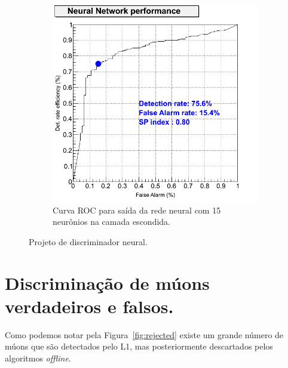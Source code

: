 \begin{figure}[htpb!]
\begin{subfigure}[b]{0.45\textwidth}
                \includegraphics[width=\textwidth]{images/sglmuon/roc_perf_match_NN.png}
            \caption{Curva ROC para saída da rede neural com 15 neurônios na
            camada escondida.}
            \label{fig:ROCNN191715}
        \end{subfigure}
        \caption{Projeto de discriminador neural.}
\end{figure}

\section{Discriminação de múons verdadeiros e falsos.}

Como podemos notar pela Figura~\ref{fig:rejected} existe um grande número de
múons que são detectados pelo L1, mas posteriormente descartados pelos
algoritmos \emph{offline}.



